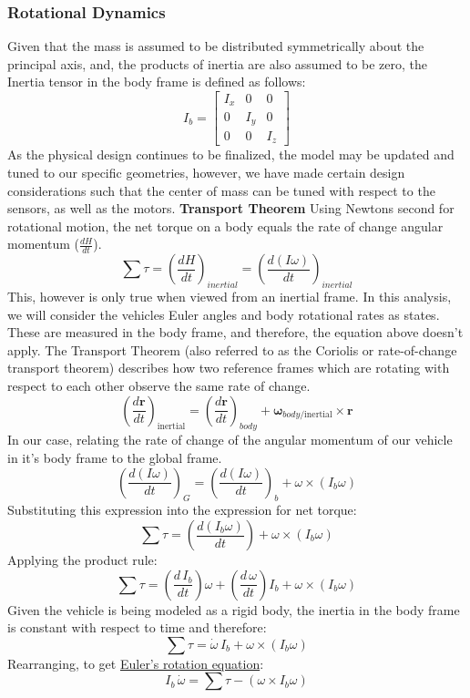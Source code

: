\documentclass[conf]{new-aiaa}
\begin{document}
\subsubsection{Rotational Dynamics}
Given that the mass is assumed to be distributed symmetrically about the principal axis, and, the products of inertia are also assumed to be zero, the Inertia tensor in the body frame is defined as follows:
$$I_b = \begin{bmatrix}
    I_x&0&0\\0&I_y&0\\0&0&I_z
\end{bmatrix}$$
As the physical design continues to be finalized, the model may be updated and tuned to our specific geometries, however, we have made certain design considerations such that the center of mass can be tuned with respect to the sensors, as well as the motors. 
\textbf{Transport Theorem}
Using Newtons second for rotational motion, the net torque on a body equals the rate of change angular momentum ($\frac{dH}{dt}$).
$$\sum\tau =\left(\frac{dH}{dt}\right)_{inertial}  = \left(\frac{d(I\omega)}{dt}\right)_{inertial} $$
This, however is only true when viewed from an inertial frame. In this analysis, we will consider the vehicles Euler angles and body rotational rates as states. These are measured in the body frame, and therefore, the equation above doesn't apply. The Transport Theorem (also referred to as the Coriolis or rate-of-change transport theorem) describes how two reference frames which are rotating with respect to each other observe the same rate of change.
$$\left( \frac{d\mathbf{r}}{dt} \right)_{\text{inertial}} = \left( \frac{d\mathbf{r}}{dt} \right)_{body} + \boldsymbol{\omega}_{body/\text{inertial}} \times \mathbf{r}$$
In our case, relating the rate of change of the angular momentum of our vehicle in it's body frame to the global frame. 
$$\left(\frac{d(I\omega)}{dt}\right)_{G} = \left(\frac{d(I\omega)}{dt}\right)_b + \omega \times (I_b\omega)$$
Substituting this expression into the expression for net torque:
$$\sum\tau = \left(\frac{d(I_b\omega)}{dt}\right) + \omega \times (I_b\omega)$$
Applying the product rule:
$$\sum\tau = \left(\frac{d\,I_b}{dt}\right)\omega + \left(\frac{d\,\omega}{dt}\right)I_b + \omega \times (I_b\omega)$$
Given the vehicle is being modeled as a rigid body, the inertia in the body frame is constant with respect to time and therefore:
$$\sum\tau =  \dot{\omega}\,I_b + \omega \times (I_b\omega)$$
Rearranging, to get \ul{Euler's rotation equation}: 
$$I_b\,\dot{\omega}=   \sum\tau - (\omega \times I_b\omega)$$
\end{document}
